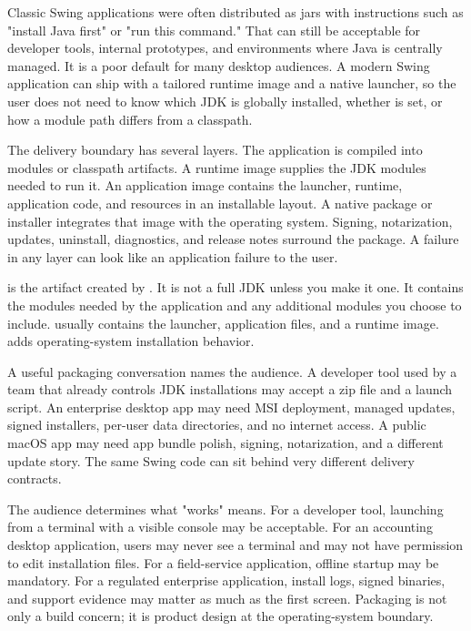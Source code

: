 Classic Swing applications were often distributed as jars with instructions such as "install Java first" or "run this command." That can still be acceptable for developer tools, internal prototypes, and environments where Java is centrally managed. It is a poor default for many desktop audiences. A modern Swing application can ship with a tailored runtime image and a native launcher, so the user does not need to know which JDK is globally installed, whether  is set, or how a module path differs from a classpath.

The delivery boundary has several layers. The application is compiled into modules or classpath artifacts. A runtime image supplies the JDK modules needed to run it. An application image contains the launcher, runtime, application code, and resources in an installable layout. A native package or installer integrates that image with the operating system. Signing, notarization, updates, uninstall, diagnostics, and release notes surround the package. A failure in any layer can look like an application failure to the user.

 is the artifact created by . It is not a full JDK unless you make it one. It contains the modules needed by the application and any additional modules you choose to include.  usually contains the launcher, application files, and a runtime image.  adds operating-system installation behavior.

A useful packaging conversation names the audience. A developer tool used by a team that already controls JDK installations may accept a zip file and a launch script. An enterprise desktop app may need MSI deployment, managed updates, signed installers, per-user data directories, and no internet access. A public macOS app may need app bundle polish, signing, notarization, and a different update story. The same Swing code can sit behind very different delivery contracts.

The audience determines what "works" means. For a developer tool, launching from a terminal with a visible console may be acceptable. For an accounting desktop application, users may never see a terminal and may not have permission to edit installation files. For a field-service application, offline startup may be mandatory. For a regulated enterprise application, install logs, signed binaries, and support evidence may matter as much as the first screen. Packaging is not only a build concern; it is product design at the operating-system boundary.


